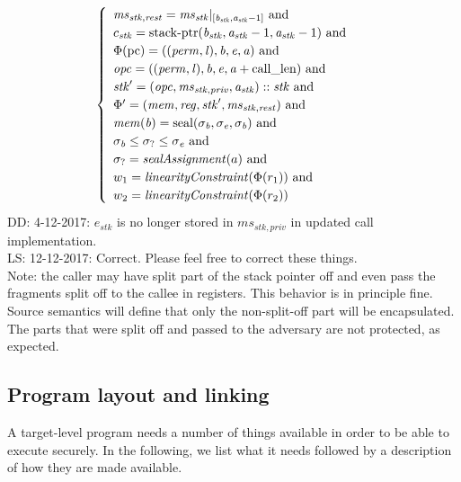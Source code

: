 \documentclass[a3paper]{article}
\newcommand\lau[1]{{\color{purple} \sf \footnotesize {LS: #1}}\\}
\newcommand\dominique[1]{{\color{purple} \sf \footnotesize {DD: #1}}\\}
\newcommand{\tand}{\text{ and }}
\newcommand{\shareddom}[1]{\mathrm{#1}}
\newcommand{\perm}{\var{perm}}
\newcommand{\lin}{\var{l}}
\newcommand{\stkptr}[1]{\mathrm{stack\text{-}ptr}(#1)}
\newcommand{\seal}[1]{\shareddom{seal}(#1)}
\newcommand{\var}[1]{\mathit{#1}}
\newcommand{\reg}{\var{reg}}
\newcommand{\mem}{\var{mem}}
\newcommand{\ms}{\var{ms}}
\newcommand{\stk}{\var{stk}}
\newcommand{\priv}{\var{priv}}
\newcommand{\opc}{\var{opc}}
\newcommand{\baddr}{\var{b}}
\newcommand{\eaddr}{\var{e}}
\newcommand{\aaddr}{\var{a}}
\newcommand{\constant}[1]{\mathrm{#1}}
\newcommand{\calllen}{\constant{call\_len}}
\newcommand{\pcreg}{\mathrm{pc}}
\newcommand{\plainfun}[2]{
  \ifthenelse{\equal{#2}{}}
  {\mathit{#1}}
  {\mathit{#1}(#2)}
}
\newcommand{\linCons}[1]{\plainfun{linearityConstraint}{#1}}
\newcommand{\sealAss}[1]{\plainfun{sealAssignment}{#1}}
\begin{document}
\begin{align*}
\begin{cases}
\begin{array}[t]{l}
                                                   \ms_{\stk,\var{rest}} = \ms_\stk|_{[\baddr_\stk,\aaddr_\stk - 1]} \tand \\
                                                   c_\stk = \stkptr{\baddr_\stk,\aaddr_\stk-1,\aaddr_\stk-1} \tand \\
                                                   \Phi(\pcreg) = ((\perm,\lin),\baddr,\eaddr,\aaddr) \tand \\
                                                   \opc = ((\perm,\lin),\baddr,\eaddr,\aaddr+\calllen) \tand \\
                                                   \stk' = (\opc,\ms_{\stk,\priv},\aaddr_\stk) :: \stk \tand\\
                                                   \Phi' = (\mem,\reg,\stk',\ms_{\stk,\var{rest}})\tand\\
                                                   \mem(\baddr) = \seal{\sigma_\baddr,\sigma_\eaddr,\sigma_\baddr}\tand\\
                                                   \sigma_\baddr \leq \sigma_? \leq \sigma_\eaddr \tand\\
                                                   \sigma_? = \sealAss{a} \tand\\
                                                   w_1 = \linCons{\Phi(r_1)} \tand \\
                                                   w_2 = \linCons{\Phi(r_2)}
                                                 \end{array}
                                               \end{cases}
\end{align*}
\dominique{4-12-2017: $e_\stk$ is no longer stored in $\ms_{\stk,\priv}$ in updated call implementation.}
\lau{12-12-2017: Correct. Please feel free to correct these things.}

Note: the caller may have split part of the stack pointer off and even pass the fragments split off to the callee in registers.
This behavior is in principle fine.
Source semantics will define that only the non-split-off part will be encapsulated.
The parts that were split off and passed to the adversary are not protected, as expected.

\subsection{Program layout and linking}
A target-level program needs a number of things available in order to be able to execute securely. In the following, we list what it needs followed by a description of how they are made available.
\end{document}
